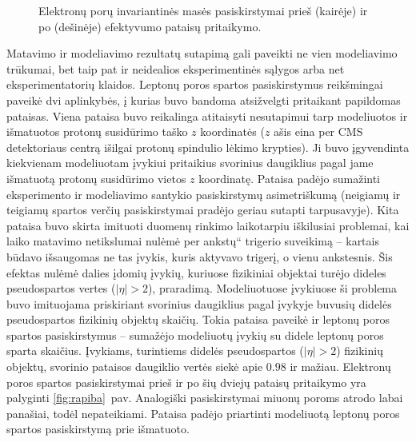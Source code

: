 \documentclass[a4paper, 12pt, oneside]{article}
\newcommand{\ltq}[1]{{\quotedblbase{}#1\textquotedblleft{}}}
\newlength\q
\begin{document}
\begin{figure}[t!]
	\vspace{-0.6cm}
	\caption{\label{fig:invMba_ee} Elektronų porų invariantinės masės pasiskirstymai prieš (kairėje) ir po (dešinėje)
	efektyvumo pataisų pritaikymo.}
\end{figure}

Matavimo ir modeliavimo rezultatų sutapimą gali paveikti ne vien modeliavimo trūkumai, bet taip pat ir neidealios
eksperimentinės sąlygos arba net eksperimentatorių klaidos.
Leptonų poros spartos pasiskirstymus reikšmingai paveikė dvi aplinkybės, į kurias buvo bandoma atsižvelgti pritaikant
papildomas pataisas.
Viena pataisa buvo reikalinga atitaisyti nesutapimui tarp modeliuotos ir išmatuotos protonų susidūrimo taško $z$
koordinatės ($z$ ašis eina per CMS detektoriaus centrą išilgai protonų spindulio lėkimo krypties).
Ji buvo įgyvendinta kiekvienam modeliuotam įvykiui pritaikius svorinius daugiklius pagal jame išmatuotą protonų susidūrimo
vietos $z$ koordinatę.
Pataisa padėjo sumažinti eksperimento ir modeliavimo santykio pasiskirstymų asimetriškumą (neigiamų ir teigiamų spartos verčių
pasiskirstymai pradėjo geriau sutapti tarpusavyje).
Kita pataisa buvo skirta imituoti duomenų rinkimo laikotarpiu iškilusiai problemai, kai laiko matavimo netikslumai nulėmė
\ltq{per ankstų} trigerio suveikimą -- kartais būdavo išsaugomas ne tas įvykis, kuris aktyvavo trigerį, o vienu ankstesnis.
Šis efektas nulėmė dalies įdomių įvykių, kuriuose fizikiniai objektai turėjo dideles pseudospartos vertes ($|\eta|>2$), praradimą.
Modeliuotuose įvykiuose ši problema buvo imituojama priskiriant svorinius daugiklius pagal įvykyje buvusių didelės pseudospartos
fizikinių objektų skaičių.
Tokia pataisa paveikė ir leptonų poros spartos pasiskirstymus -- sumažėjo modeliuotų įvykių su didele leptonų poros sparta skaičius.
Įvykiams, turintiems didelės pseudospartos ($|\eta|>2$) fizikinių objektų, svorinio pataisos daugiklio vertės siekė apie $0.98$ ir mažiau.
Elektronų poros spartos pasiskirstymai prieš ir po šių dviejų pataisų pritaikymo yra palyginti \ref{fig:rapiba}~pav.
Analogiški pasiskirstymai miuonų poroms atrodo labai panašiai, todėl nepateikiami.
Pataisa padėjo priartinti modeliuotą leptonų poros spartos pasiskirstymą prie išmatuoto.
\end{document}
